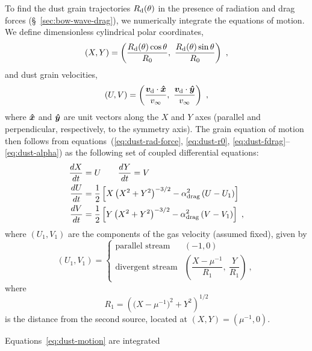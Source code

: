 To find the dust grain trajectories \(R_{\text{d}}(\theta)\) in the presence of
radiation and drag forces (\S~\ref{sec:bow-wave-drag}), we numerically
integrate the equations of motion. We define dimensionless cylindrical
polar coordinates,
\begin{equation}
  \label{eq:dust-XY}
  (X, Y) = \left(\frac{R\grain(\theta) \cos\theta } {R_0}, \ 
    \frac{R\grain(\theta) \sin\theta } {R_0}\right)
  \ ,
\end{equation}
and dust grain velocities,
\begin{equation}
  \label{eq:dust-UV}
  (U, V) = \left( \frac{\bm{v}\grain \cdot \uvec{x}} {v_\infty}, \ 
  \frac{\bm{v}\grain \cdot \uvec{y}} {v_\infty}\right) \ ,
\end{equation}
where \(\bm{\hat{x}}\) and \(\bm{\hat{y}}\) are unit vectors along the \(X\)
and \(Y\) axes (parallel and perpendicular, respectively, to the
symmetry axis).  The grain equation of motion then follows from
equations~(\ref{eq:dust-rad-force}, \ref{eq:dust-r0},
\ref{eq:dust-fdrag}--\ref{eq:dust-alpha}) as the following set of
coupled differential equations:
\begin{gather}
  \label{eq:dust-motion}
  \begin{aligned}
    \frac{d X}{d t} &= U \quad\quad
    \frac{d Y}{d t} = V \\
    \frac{d U}{d t} &= \frac12 \left[  
      X \left(X^2 + Y^2\right)^{-3/2} - \alpha_{\text{drag}}^2 \left(U - U_1\right)
    \right] \\
    \frac{d V}{d t} &= \frac12 \left[  
      Y \left(X^2 + Y^2\right)^{-3/2} - \alpha_{\text{drag}}^2 \left(V - V_1\right)
    \right] \ ,
  \end{aligned}
\end{gather}
where \((U_1, V_1)\) are the components of the gas velocity (assumed
fixed), given by
\begin{equation}
  \label{eq:dust-gas-velocities}
  (U_1, V_1) = 
  \begin{cases}
    \text{parallel stream} & (-1, 0)\\
    \text{divergent stream} &
    \left( \dfrac{X - \mu^{-1}}{R_1},\ \dfrac{Y}{R_1}\right) \ ,
  \end{cases}
\end{equation}
where
\begin{equation}
  \label{eq:dust-R1}
  R_1 = \left( \bigl(X - \mu^{-1}\bigr)^2 + Y^2 \right)^{1/2}
\end{equation}
is the distance from the second source, located at
\((X, Y) = (\mu^{-1}, 0)\).

Equations~\eqref{eq:dust-motion} are integrated 

